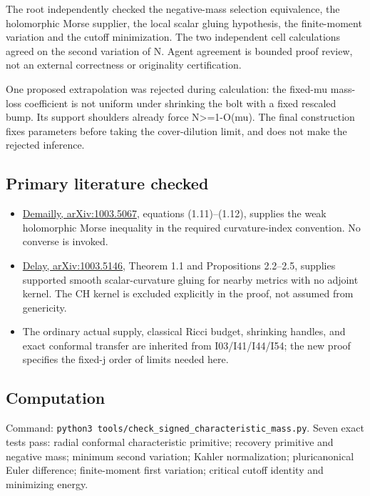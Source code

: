 \documentclass[
  10pt,
]{article}
\providecommand{\tightlist}{%
  \setlength{\itemsep}{0pt}\setlength{\parskip}{0pt}}
\begin{document}
The root independently checked the negative-mass selection equivalence,
the holomorphic Morse supplier, the local scalar gluing hypothesis, the
finite-moment variation and the cutoff minimization. The two independent
cell calculations agreed on the second variation of N. Agent agreement
is bounded proof review, not an external correctness or originality
certification.

One proposed extrapolation was rejected during calculation: the fixed-mu
mass-loss coefficient is not uniform under shrinking the bolt with a
fixed rescaled bump. Its support shoulders already force
N\textgreater=1-O(mu). The final construction fixes parameters before
taking the cover-dilution limit, and does not make the rejected
inference.

\hypertarget{primary-literature-checked}{%
\subsection{Primary literature
checked}\label{primary-literature-checked}}

\begin{itemize}
\tightlist
\item
  \href{https://arxiv.org/html/1003.5067}{Demailly, arXiv:1003.5067},
  equations (1.11)--(1.12), supplies the weak holomorphic Morse
  inequality in the required curvature-index convention. No converse is
  invoked.
\item
  \href{https://arxiv.org/html/1003.5146}{Delay, arXiv:1003.5146},
  Theorem 1.1 and Propositions 2.2--2.5, supplies supported smooth
  scalar-curvature gluing for nearby metrics with no adjoint kernel. The
  CH kernel is excluded explicitly in the proof, not assumed from
  genericity.
\item
  The ordinary actual supply, classical Ricci budget, shrinking handles,
  and exact conformal transfer are inherited from I03/I41/I44/I54; the
  new proof specifies the fixed-j order of limits needed here.
\end{itemize}

\hypertarget{computation}{%
\subsection{Computation}\label{computation}}

Command: \texttt{python3\ tools/\nolinkurl{check_signed_characteristic_mass.py}}.
Seven exact tests pass: radial conformal characteristic primitive;
recovery primitive and negative mass; minimum second variation; Kahler
normalization; pluricanonical Euler difference; finite-moment first
variation; critical cutoff identity and minimizing energy.
\end{document}
